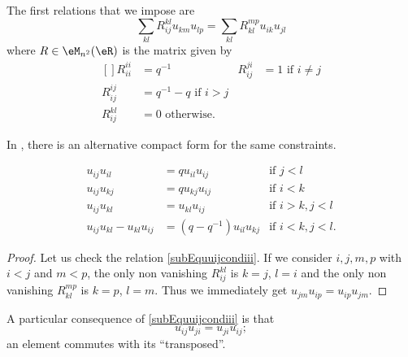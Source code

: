 The first relations that we impose are
\begin{equation}        \label{EqRelsSUqnAvecR}
	\sum_{kl}R^{kl}_{ij}u_{km}u_{lp}=\sum_{kl}R^{mp}_{kl}u_{ik}u_{jl}
\end{equation}
where $R\in\eM_{n^2}(\eR)$ is the matrix given by
\begin{equation}
	\begin{aligned}[]
		R_{ii}^{ii} & =q^{-1}                 & R_{ij}^{ji} & =1\text{ if }i\neq j \\
		R_{ij}^{ij} & =q^{-1}-q\text{ if }i>j                                      \\
		R_{ij}^{kl} & =0\text{ otherwise}.
	\end{aligned}
\end{equation}

\begin{remark}
	In \cite{Bragiel}, there is an alternative compact form for the same constraints.
\end{remark}

\begin{proposition}
	\begin{subequations}        \label{SUBEquuijcondiv}
		\begin{align}
			u_{ij}u_{il}              & =qu_{il}u_{ij}          & \text{if }j<l         \label{subEquuijcondi} \\
			u_{ij}u_{kj}              & =qu_{kj}u_{ij}          & \text{if }i<k\label{subEquuijcondii}         \\
			u_{ij}u_{kl}              & =u_{kl}u_{ij}           & \text{if }i>k,j<l\label{subEquuijcondiii}    \\
			u_{ij}u_{kl}-u_{kl}u_{ij} & =(q-q^{-1})u_{il}u_{kj} & \text{if }i<k,j<l\label{subEquuijcondiv}.
		\end{align}
	\end{subequations}
\end{proposition}

\begin{proof}
	Let us check the relation \eqref{subEquuijcondiii}. If we consider \( i,j,m,p\) with \( i<j\) and \( m<p\), the only non vanishing \( R^{kl}_{ij}\) is \( k=j\), \( l=i\) and the only non vanishing \( R^{mp}_{kl}\) is \( k=p\), \( l=m\). Thus we immediately get \( u_{jm}u_{ip}=u_{ip}u_{jm}\).
\end{proof}


A particular consequence of \eqref{subEquuijcondiii} is that
\begin{equation}
	u_{ij}u_{ji}=u_{ji}u_{ij};
\end{equation}
an element commutes with its ``transposed''.

